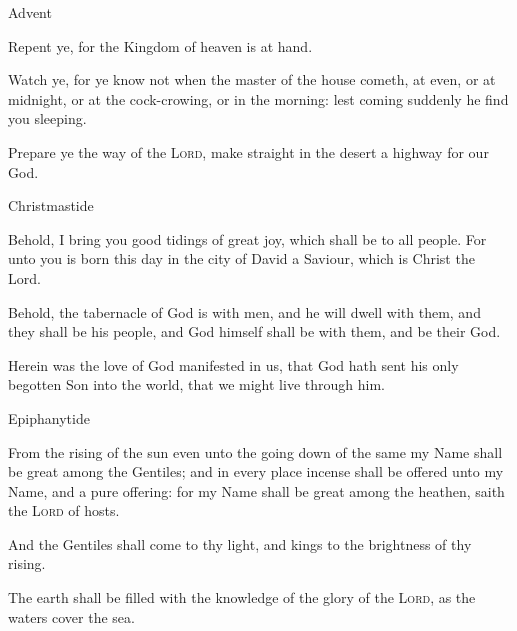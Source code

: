 \begin{multicols}{2}
\centerline{\color{RubricRed}\small%
Advent}
\par\noindent
    Repent ye, for the Kingdom of heaven is at hand.
    \par
    Watch ye, for ye know not when the master of the house cometh, at even, or at midnight, or at the cock-crowing, or in the morning: lest coming suddenly he find you sleeping.
    \par
    Prepare ye the way of the \textsc{Lord}, make straight in the desert a highway for our God.\\
    
\centerline{\color{RubricRed}\small%
Christmastide}
\par\noindent
    Behold, I bring you good tidings of great joy, which shall be to all people. For unto you is born this day in the city of David a Saviour, which is Christ the Lord.
    \par
    Behold, the tabernacle of God is with men, and he will dwell with them, and they shall be his people, and God himself shall be with them, and be their God.
    \par
    Herein was the love of God manifested in us, that God hath sent his only begotten Son into the world, that we might live through him. \\

\centerline{\color{RubricRed}\small%
Epiphanytide}
\par\noindent
    From the rising of the sun even unto the going down of the same my Name shall be great among the Gentiles; and in every place incense shall be offered unto my Name, and a pure offering: for my Name shall be great among the heathen, saith the \textsc{Lord} of hosts.
    
    And the Gentiles shall come to thy light, and kings to the brightness of thy rising.\par
    The earth shall be filled with the knowledge of the glory of the \textsc{Lord}, as the waters cover the sea.\\


\end{multicols}
